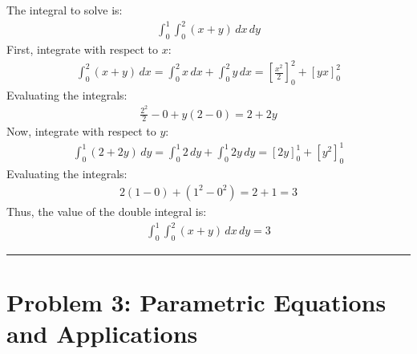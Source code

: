 \documentclass[letterpaper,10pt,english]{jupyterBook}
\begin{document}
\sphinxAtStartPar
The integral to solve is:
\begin{equation*}
\begin{split}
\int_0^1 \int_0^2 (x + y) \, dx \, dy
\end{split}
\end{equation*}
\sphinxAtStartPar
First, integrate with respect to \(x\):
\begin{equation*}
\begin{split}
\int_0^2 (x + y) \, dx = \int_0^2 x \, dx + \int_0^2 y \, dx = \left[ \frac{x^2}{2} \right]_0^2 + \left[ yx \right]_0^2
\end{split}
\end{equation*}
\sphinxAtStartPar
Evaluating the integrals:
\begin{equation*}
\begin{split}
\frac{2^2}{2} - 0 + y(2 - 0) = 2 + 2y
\end{split}
\end{equation*}
\sphinxAtStartPar
Now, integrate with respect to \(y\):
\begin{equation*}
\begin{split}
\int_0^1 (2 + 2y) \, dy = \int_0^1 2 \, dy + \int_0^1 2y \, dy = \left[ 2y \right]_0^1 + \left[ y^2 \right]_0^1
\end{split}
\end{equation*}
\sphinxAtStartPar
Evaluating the integrals:
\begin{equation*}
\begin{split}
2(1 - 0) + (1^2 - 0^2) = 2 + 1 = 3
\end{split}
\end{equation*}
\sphinxAtStartPar
Thus, the value of the double integral is:
\begin{equation*}
\begin{split}
\int_0^1 \int_0^2 (x + y) \, dx \, dy = 3
\end{split}
\end{equation*}

\bigskip\hrule\bigskip



\section{Problem 3: Parametric Equations and Applications}
\label{\detokenize{prerequisites:problem-3-parametric-equations-and-applications}}
\end{document}
